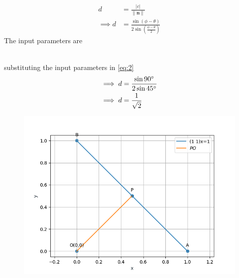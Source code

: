 \documentclass[10pt]{article}
\providecommand{\brak}[1]{\ensuremath{\left(#1\right)}}
\providecommand{\norm}[1]{\left\lVert#1\right\rVert}
\providecommand{\abs}[1]{\left\vert#1\right\vert}
\let\vec\mathbf
\begin{document}
\begin{enumerate}
\begin{align}
d&=\frac{\abs{c}}{\norm{\vec{n}}}\\
\implies d&=\frac{\sin\brak{\phi-\theta}}{2\sin\brak{\frac{\phi-\theta}{2}}}
\label{eq:2}
\end{align}
The input parameters are\\
\begin{table}[h!]
	\centering
 	
\caption{}
\label{table}
\end{table}\\
substituting the input parameters in \eqref{eq:2}
\begin{align}
\implies d&=\frac{\sin{90\degree}}{2\sin{45\degree}}\\
\implies d&=\frac{1}{\sqrt{2}}
\end{align}
\begin{figure}[!h]
 \begin{center}
 	\includegraphics[width=\columnwidth]{./figs/fig.png}
 \end{center}
\caption{}
\label{fig:Fig1}
\end{figure}

\end{enumerate}
\end{document}
